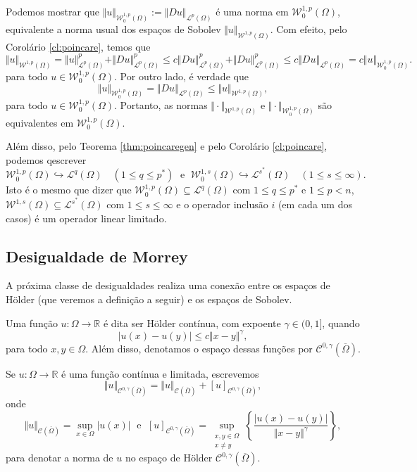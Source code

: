 \documentclass[a4paper, 11pt]{book}
\theoremstyle{definition}
\newcommand{\bR}{\mathbb{R}}
\newcommand{\cC}{\mathcal{C}}
\newcommand{\cL}{\mathcal{L}}
\newcommand{\cW}{\mathcal{W}}
\begin{document}
Podemos mostrar que $\Vert u \Vert_{\cW_0^{1,p}(\Omega)} := \Vert Du \Vert_{\cL^p(\Omega)}$ é uma norma em $\cW^{1,p}_0(\Omega)$, equivalente a norma usual dos espaços de Sobolev $\Vert u \Vert_{\cW^{1,p}(\Omega)}$. Com efeito, pelo Corolário \ref{cl:poincare}, temos que
\[
    \Vert u \Vert_{\cW^{1,p}(\Omega)} = \Vert u \Vert_{\cL^p(\Omega)}^p + \Vert Du \Vert_{\cL^p(\Omega)}^p \leqslant c \Vert Du \Vert_{\cL^p(\Omega)}^p + \Vert Du \Vert_{\cL^p(\Omega)}^p \leqslant c \Vert Du \Vert_{\cL^p(\Omega)} = c \Vert u \Vert_{\cW^{1,p}_0(\Omega)}.
\]
para todo $u \in \cW^{1,p}_0(\Omega)$.
Por outro lado, é verdade que
\[
    \Vert u \Vert_{\cW^{1,p}_0(\Omega)} = \Vert Du \Vert_{\cL^p(\Omega)} \leqslant \Vert u \Vert_{\cW^{1,p}(\Omega)},
\]
para todo $u \in \cW^{1,p}_0(\Omega)$.
Portanto, as normas $\Vert \cdot \Vert_{\cW^{1,p}(\Omega)}$ e $\Vert \cdot \Vert_{\cW^{1,p}_0(\Omega)}$ são equivalentes em $\cW^{1,p}_0(\Omega)$.

Além disso, pelo Teorema \ref{thm:poincaregen} e pelo Corolário \ref{cl:poincare}, podemos qescrever 
\[
    \cW^{1,p}_0(\Omega) \hookrightarrow \cL^q(\Omega) \quad (1 \leqslant q \leqslant p^*) \;\text{ e }\; \cW^{1,s}_0(\Omega) \hookrightarrow \cL^{s^*}(\Omega) \quad (1 \leqslant s \leqslant \infty).
\]
Isto é o mesmo que dizer que $\cW^{1,p}_0(\Omega) \subseteq \cL^q(\Omega)$ com $1 \leqslant q \leqslant p^*$ e $1 \leqslant p < n$, $\cW^{1,s}(\Omega) \subseteq \cL^{s^*}(\Omega)$ com $1 \leqslant s \leqslant \infty$ e o operador inclusão $i$ (em cada um dos casos) é um operador linear limitado.

\subsection{Desigualdade de Morrey}

A próxima classe de desigualdades realiza uma conexão entre os espaços de Hölder (que veremos a definição a seguir) e os espaços de Sobolev.

\begin{dbox}
    Uma função $u : \Omega \to \bR$ é dita ser Hölder contínua, com expoente $\gamma \in (0,1]$, quando
    \[
        |u(x) - u(y)| \leqslant c \Vert x - y \Vert^\gamma,
    \]
    para todo $x,y \in \Omega$. Além disso, denotamos o espaço dessas funções por $\cC^{0,\gamma}(\overline\Omega)$.
\end{dbox}

\begin{dbox}
    Se $u : \Omega \to \bR$ é uma função contínua e limitada, escrevemos
    \[
        \Vert u \Vert_{\cC^{0,\gamma}(\overline\Omega)} = \Vert u \Vert_{\cC(\overline\Omega)} + [u]_{\cC^{0,\gamma}(\overline\Omega)},
    \]
    onde
    \[
        \Vert u \Vert_{\cC(\overline\Omega)} = \sup_{x \in \Omega} |u(x)| \;\text{ e }\; [u]_{\cC^{0,\gamma}(\overline\Omega)} = \sup_{\substack{x,y \in \Omega\\x \neq y}} \left\{ \frac{|u(x) - u(y)|}{\Vert x - y \Vert^\gamma} \right\},
    \]
    para denotar a norma de $u$ no espaço de Hölder $\cC^{0,\gamma}(\overline\Omega)$.
\end{dbox}
\end{document}
